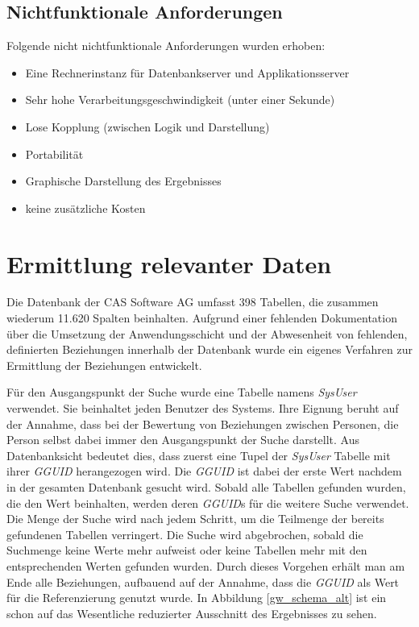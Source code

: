 \subsection{Nichtfunktionale Anforderungen}

Folgende nicht nichtfunktionale Anforderungen wurden erhoben:

\begin{itemize}
	
	\item Eine Rechnerinstanz für Datenbankserver und Applikationsserver 
	
	\item Sehr hohe Verarbeitungsgeschwindigkeit (unter einer Sekunde)
	
	\item Lose Kopplung (zwischen Logik und Darstellung)
	
	\item Portabilität
	
	\item Graphische Darstellung des Ergebnisses
	
	\item keine zusätzliche Kosten

\end{itemize}

\section{Ermittlung relevanter Daten}
\label{ch:Systemanalyse:sec:Information}

Die Datenbank der CAS Software AG umfasst 398 Tabellen, die zusammen wiederum 11.620 Spalten beinhalten. Aufgrund einer fehlenden Dokumentation über die Umsetzung der Anwendungsschicht und der Abwesenheit von fehlenden, definierten Beziehungen innerhalb der Datenbank wurde ein eigenes Verfahren zur Ermittlung der Beziehungen entwickelt. 

Für den Ausgangspunkt der Suche wurde eine Tabelle namens \textit{SysUser} verwendet. Sie beinhaltet jeden Benutzer des Systems. Ihre Eignung beruht auf der Annahme, dass bei der Bewertung von Beziehungen zwischen Personen, die Person selbst dabei immer den Ausgangspunkt der Suche darstellt. Aus Datenbanksicht bedeutet dies, dass zuerst eine Tupel der \textit{SysUser} Tabelle mit ihrer \textit{GGUID} herangezogen wird. Die \textit{GGUID} ist dabei der erste Wert nachdem in der gesamten Datenbank gesucht wird. Sobald alle Tabellen gefunden wurden, die den Wert beinhalten, werden deren \textit{GGUID}s für die weitere Suche verwendet. Die Menge der Suche wird nach jedem Schritt, um die Teilmenge der bereits gefundenen Tabellen verringert. Die Suche wird abgebrochen, sobald die Suchmenge keine Werte mehr aufweist oder keine Tabellen mehr mit den entsprechenden Werten gefunden wurden. Durch dieses Vorgehen erhält man am Ende alle Beziehungen, aufbauend auf der Annahme, dass die \textit{GGUID} als Wert für die Referenzierung genutzt wurde. In Abbildung \ref{gw_schema_alt} ist ein schon auf das Wesentliche reduzierter Ausschnitt des Ergebnisses zu sehen. 

